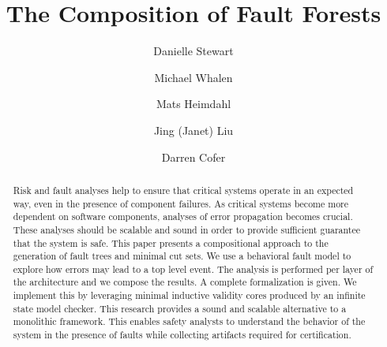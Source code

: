 \documentclass{llncs}
\begin{document}
\newcommand{\stateequiv}{\equiv_{s}}
\newcommand{\traceequiv}{\equiv_{\sigma}}
\newcommand{\ta}{\text{TA}}
\newcommand{\cta}{\text{TA$_{C}$}}
\newcommand{\tta}{\text{TA$_{T}$}}
\newcommand{\ucalg}{\texttt{\small{IVC\_UC}}}
\newcommand{\ucbfalg}{\texttt{\small{IVC\_UCBF}}}
\newcommand\doesnotentail{\mkern-2mu\not\mkern2mu\vdash}
\newcommand{\bool}[0]{\mathit{bool}}
\newcommand{\reach}[0]{\mathit{R}}
\newcommand{\ite}[3]{\mathit{if}\ {#1}\ \mathit{then}\ {#2}\ \mathit{else}\ {#3}}


\title{The Composition of Fault Forests}

\author{Danielle Stewart  \and Michael Whalen \and Mats Heimdahl \and 
Jing (Janet) Liu \and Darren Cofer}




\maketitle

\begin{abstract}
Risk and fault analyses help to ensure that critical systems operate in an expected way, even in the presence of component failures. As critical systems become more dependent on software components, analyses of error propagation becomes crucial. These analyses should be scalable and sound in order to provide sufficient guarantee that the system is safe. This paper presents a compositional approach to the generation of fault trees and minimal cut sets. We use a behavioral fault model to explore how errors may lead to a top level event. The analysis is performed per layer of the architecture and we compose the results. A complete formalization is given. We implement this by leveraging minimal inductive validity cores produced by an infinite state model checker. This research provides a sound and scalable alternative to a monolithic framework. This enables safety analysts to understand the behavior of the system in the presence of faults while collecting artifacts required for certification.

\end{abstract}
\end{document}
